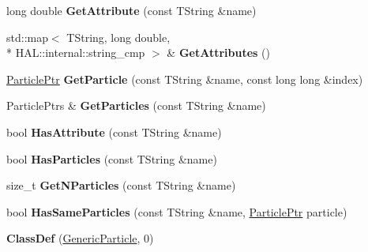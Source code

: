 \begin{DoxyCompactItemize}
\item 
\hypertarget{class_h_a_l_1_1_generic_particle_aa0dcd8725c4ca8c7c927b79fa6565e6b}{long double {\bfseries Get\+Attribute} (const T\+String \&name)}\label{class_h_a_l_1_1_generic_particle_aa0dcd8725c4ca8c7c927b79fa6565e6b}

\item 
\hypertarget{class_h_a_l_1_1_generic_particle_ac592f263b62437d8176156c640d2d59d}{std\+::map$<$ T\+String, long double, \\*
H\+A\+L\+::internal\+::string\+\_\+cmp $>$ \& {\bfseries Get\+Attributes} ()}\label{class_h_a_l_1_1_generic_particle_ac592f263b62437d8176156c640d2d59d}

\item 
\hypertarget{class_h_a_l_1_1_generic_particle_aa6f6dd45c53b81bdcda0daf9872d3dd6}{\hyperlink{class_h_a_l_1_1_generic_particle}{Particle\+Ptr} {\bfseries Get\+Particle} (const T\+String \&name, const long long \&index)}\label{class_h_a_l_1_1_generic_particle_aa6f6dd45c53b81bdcda0daf9872d3dd6}

\item 
\hypertarget{class_h_a_l_1_1_generic_particle_ae82f028aef354682aaded70b93da06de}{Particle\+Ptrs \& {\bfseries Get\+Particles} (const T\+String \&name)}\label{class_h_a_l_1_1_generic_particle_ae82f028aef354682aaded70b93da06de}

\item 
\hypertarget{class_h_a_l_1_1_generic_particle_a09766ae2f607206b0bb623855f5d11d2}{bool {\bfseries Has\+Attribute} (const T\+String \&name)}\label{class_h_a_l_1_1_generic_particle_a09766ae2f607206b0bb623855f5d11d2}

\item 
\hypertarget{class_h_a_l_1_1_generic_particle_ac0f562c1225127b099ef7df56ae3177d}{bool {\bfseries Has\+Particles} (const T\+String \&name)}\label{class_h_a_l_1_1_generic_particle_ac0f562c1225127b099ef7df56ae3177d}

\item 
\hypertarget{class_h_a_l_1_1_generic_particle_afddc36ec1e6dad1c155449386ea716b6}{size\+\_\+t {\bfseries Get\+N\+Particles} (const T\+String \&name)}\label{class_h_a_l_1_1_generic_particle_afddc36ec1e6dad1c155449386ea716b6}

\item 
\hypertarget{class_h_a_l_1_1_generic_particle_a968d9fb1e1800b48182055ec8df38e39}{bool {\bfseries Has\+Same\+Particles} (const T\+String \&name, \hyperlink{class_h_a_l_1_1_generic_particle}{Particle\+Ptr} particle)}\label{class_h_a_l_1_1_generic_particle_a968d9fb1e1800b48182055ec8df38e39}

\item 
\hypertarget{class_h_a_l_1_1_generic_particle_ad23fc850d01f55da3b3c27366504289e}{{\bfseries Class\+Def} (\hyperlink{class_h_a_l_1_1_generic_particle}{Generic\+Particle}, 0)}\label{class_h_a_l_1_1_generic_particle_ad23fc850d01f55da3b3c27366504289e}

\end{DoxyCompactItemize}
